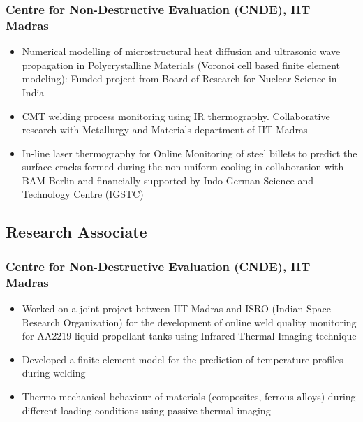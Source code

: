 \documentclass{my_cv}%
\begin{document}
\subsubsection{Centre for Non-Destructive Evaluation (CNDE), IIT Madras}
\begin{itemize}[leftmargin=0.15in]
\setlength\itemsep{-0.1em}
\color{mygray}
\item Numerical modelling of microstructural heat diffusion and ultrasonic wave propagation in Polycrystalline Materials (Voronoi cell based finite element modeling): Funded project from Board of Research for Nuclear Science in India
\item CMT welding process monitoring using IR thermography. Collaborative research with Metallurgy and Materials department of IIT Madras
\item In-line laser thermography for Online Monitoring of steel billets to predict the surface cracks formed during the non-uniform cooling in collaboration with BAM Berlin and financially supported by Indo-German Science and Technology Centre (IGSTC)
\end{itemize}

\subsection{Research Associate}
\subsubsection{Centre for Non-Destructive Evaluation (CNDE), IIT Madras}
\begin{itemize}[leftmargin=0.15in]
\setlength\itemsep{-0.1em}
\color{mygray}
\item Worked on a joint project between IIT Madras and ISRO (Indian Space Research Organization) for the development of online weld quality monitoring for AA2219 liquid propellant tanks using Infrared Thermal Imaging technique
\item Developed a finite element model for the prediction of temperature profiles during welding
\item Thermo-mechanical behaviour of materials (composites, ferrous alloys) during different loading conditions using passive thermal imaging
\end{itemize}
\end{document}
